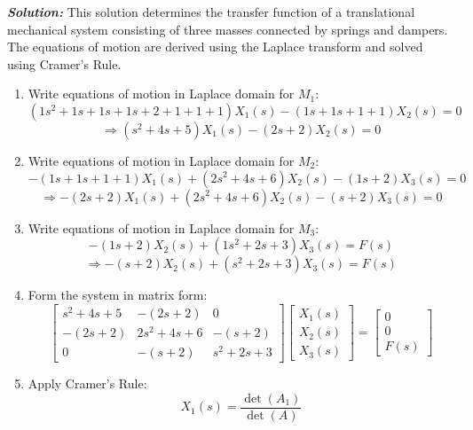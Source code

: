 \documentclass[11pt]{article}
\begin{document}
\vspace{12pt}

\noindent \textbf{\textit{Solution:}}
This solution determines the transfer function of a translational mechanical system consisting of three masses connected by springs and dampers. The equations of motion are derived using the Laplace transform and solved using Cramer's Rule.

\begin{enumerate}[label=(\alph*), itemindent=*, leftmargin=*, nolistsep]

    \item Write equations of motion in Laplace domain for $M_1$:
    \[
    (1s^2 + 1s + 1s + 1s + 2 + 1 + 1 + 1)X_1(s) - (1s + 1s + 1 + 1)X_2(s) = 0
    \]
    \[
    \Rightarrow (s^2 + 4s + 5)X_1(s) - (2s + 2)X_2(s) = 0
    \]

    \item Write equations of motion in Laplace domain for $M_2$:
    \[
    -(1s + 1s + 1 + 1)X_1(s) + (2s^2 + 4s + 6)X_2(s) - (1s + 2)X_3(s) = 0
    \]
    \[
    \Rightarrow -(2s + 2)X_1(s) + (2s^2 + 4s + 6)X_2(s) - (s + 2)X_3(s) = 0
    \]

    \item Write equations of motion in Laplace domain for $M_3$:
    \[
    -(1s + 2)X_2(s) + (1s^2 + 2s + 3)X_3(s) = F(s)
    \]
    \[
    \Rightarrow -(s + 2)X_2(s) + (s^2 + 2s + 3)X_3(s) = F(s)
    \]

    \item Form the system in matrix form:
    \[
    \begin{bmatrix}
    s^2 + 4s + 5 & -(2s + 2) & 0 \\
    -(2s + 2) & 2s^2 + 4s + 6 & -(s + 2) \\
    0 & -(s + 2) & s^2 + 2s + 3
    \end{bmatrix}
    \begin{bmatrix}
    X_1(s) \\ X_2(s) \\ X_3(s)
    \end{bmatrix}
    =
    \begin{bmatrix}
    0 \\ 0 \\ F(s)
    \end{bmatrix}
    \]

    \item Apply Cramer's Rule:
    \[
    X_1(s) = \frac{\det(A_1)}{\det(A)}
    \]


\end{enumerate}
\end{document}
